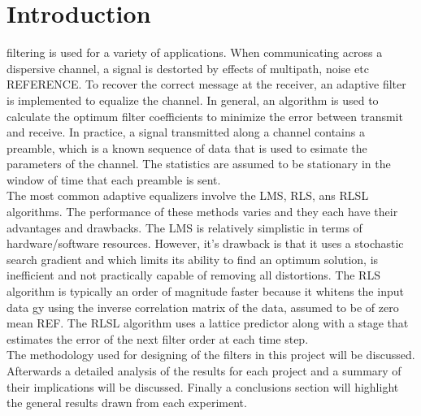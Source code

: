 \documentclass[journal]{IEEEtran}
\begin{document}

%
\IEEEpeerreviewmaketitle

\small

\section{Introduction}
%
%
%
%
 filtering is used for a variety of applications. When communicating
across a dispersive channel, a signal is destorted by effects of multipath, noise etc REFERENCE.
To recover the correct message at the receiver, an adaptive filter is implemented to equalize the channel. In general, an
algorithm is used to calculate the optimum filter coefficients to minimize the error between transmit and receive. In practice, a
signal transmitted along a channel contains a preamble, which is a known sequence of data that is used to esimate the parameters of the channel.
The statistics are assumed to be stationary in the window of time that each preamble is sent. \\ \indent The most common adaptive equalizers involve
the LMS, RLS, ans RLSL algorithms. The performance of these methods varies and they each have their advantages and drawbacks.
The LMS is relatively simplistic in terms of hardware/software resources. However, it's drawback is that it uses a stochastic search gradient
and which limits its ability to find an optimum solution, is inefficient and not practically capable of removing all distortions. The RLS algorithm is typically an order of magnitude
faster because it whitens the input data gy using the inverse correlation matrix of the data, assumed to be of zero mean REF. The RLSL
algorithm uses a lattice predictor along with a stage that estimates the error of the next filter order at each time step.\\
\indent The methodology used for designing of the filters in this project will be discussed. Afterwards a detailed analysis of the results
for each project and a summary of their implications will be discussed. Finally a conclusions section will highlight the general results drawn from each
experiment.
\end{document}
